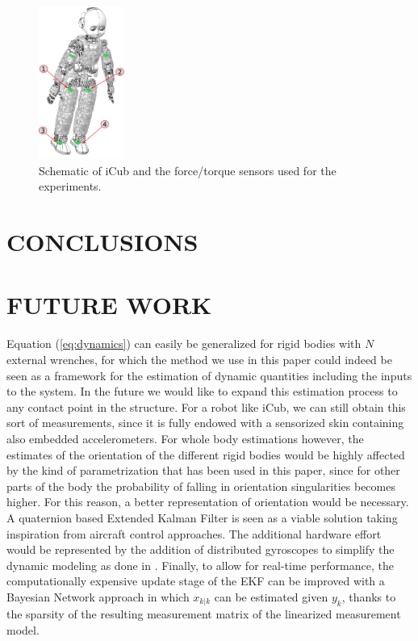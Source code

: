 \documentclass[letterpaper, 10 pt, conference]{ieeeconf}  %
\begin{document}
\begin{figure}[t!]  
  \centering
    \includegraphics[width=0.25\textwidth]{./figs/icub_force_selected.png}
    \caption{Schematic of iCub and the force/torque sensors used for the experiments. 
    \label{fig:icub_ft_sensors}}
\end{figure}


\section{CONCLUSIONS}
\label{section:conclusions}

\section{FUTURE WORK}
\label{section:futureWork}
Equation (\ref{eq:dynamics}) can easily be generalized for rigid bodies with $N$ external wrenches, for which the method we use in this paper could indeed be seen as a framework for the estimation of dynamic quantities including the inputs to the system. In the future we would like to expand this estimation process to any contact point in the structure. For a robot like iCub, we can still obtain this sort of measurements, since it is fully endowed with a sensorized skin containing also embedded accelerometers. For whole body estimations however, the estimates of the orientation of the different rigid bodies would be highly affected by the kind of parametrization that has been used in this paper, since for other parts of the body the probability of falling in orientation singularities becomes higher. For this reason, a better representation of orientation would be necessary. A quaternion based Extended Kalman Filter is seen as a viable solution taking inspiration from aircraft control approaches. The additional hardware effort would be represented by the addition of distributed gyroscopes to simplify the dynamic modeling as done in \cite{roumeliotis1999}. Finally, to allow for real-time performance, the computationally expensive update stage of the EKF can be improved with a Bayesian Network approach in which $x_{k|k}$ can be estimated given $y_k$, thanks to the sparsity of the resulting measurement matrix of the linearized measurement model.  
\end{document}
